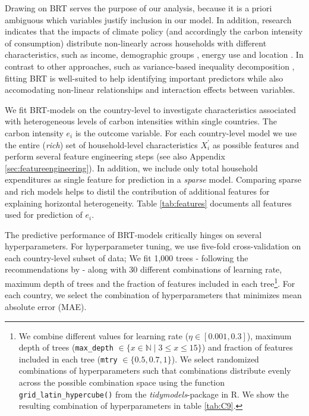 \documentclass[12pt, a4paper]{article}
\begin{document}
Drawing on BRT serves the purpose of our analysis, because it is a priori ambiguous which variables justify inclusion in our model. In addition, research indicates that the impacts of climate policy (and accordingly the carbon intensity of consumption) distribute non-linearly across households with different characteristics, such as income, demographic groups \autocite{Missbach.2023}, energy use \autocite{Farrell.2017} and location \autocite{Chan.2023}. In contrast to other approaches, such as variance-based inequality decomposition \autocite{Farrell.2017,Sager.2019,Missbach.2024}, fitting BRT is well-suited to help identifying important predictors while also accomodating non-linear relationships and interaction effects between variables.

We fit BRT-models on the country-level to investigate characteristics associated with heterogeneous levels of carbon intensities within single countries. The carbon intensity $e_{i}$ is the outcome variable. For each country-level model we use the entire (\textit{rich}) set of household-level characteristics $X_{i}^{'}$ as possible features and perform several feature engineering steps (see also Appendix \ref{sec:featureengineering}). In addition, we include only total household expenditures as single feature for prediction in a \textit{sparse} model. Comparing sparse and rich models helps to distil the contribution of additional features for explaining horizontal heterogeneity. Table \ref{tab:features} documents all features used for prediction of $e_{i}$.



The predictive performance of BRT-models critically hinges on several hyperparameters. For hyperparameter tuning, we use five-fold cross-validation on each country-level subset of data; We fit 1,000 trees - following the recommendations by \textcite{Elith.2008} - along with 30 different combinations of learning rate, maximum depth of trees and the fraction of features included in each tree\footnote{We combine different values for learning rate ($\eta \in [0.001,0.3]$), maximum depth of trees (\texttt{max\_depth} $\in \{x \in \mathbb{N} \mid 3  \leq x \leq 15 \}$) and fraction of features included in each tree (\texttt{mtry} $\in \{0.5,0.7,1\}$). We select randomized combinations of hyperparameters such that combinations distribute evenly across the possible combination space using the function \texttt{grid\_latin\_hypercube()} from the \textit{tidymodels}-package in R. We show the resulting combination of hyperparameters in table \ref{tab:C9}.}. For each country, we select the combination of hyperparameters that minimizes mean absolute error (MAE).
\end{document}
